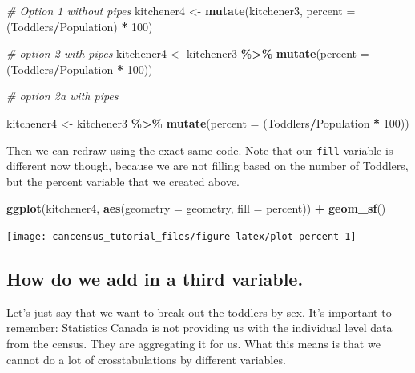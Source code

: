 \documentclass[
]{article}
\newenvironment{Shaded}{\begin{snugshade}}{\end{snugshade}}
\newcommand{\CommentTok}[1]{\textcolor[rgb]{0.56,0.35,0.01}{\textit{#1}}}
\newcommand{\DataTypeTok}[1]{\textcolor[rgb]{0.13,0.29,0.53}{#1}}
\newcommand{\DecValTok}[1]{\textcolor[rgb]{0.00,0.00,0.81}{#1}}
\newcommand{\KeywordTok}[1]{\textcolor[rgb]{0.13,0.29,0.53}{\textbf{#1}}}
\newcommand{\NormalTok}[1]{#1}
\newcommand{\OperatorTok}[1]{\textcolor[rgb]{0.81,0.36,0.00}{\textbf{#1}}}
\newcommand{\StringTok}[1]{\textcolor[rgb]{0.31,0.60,0.02}{#1}}
\begin{document}
\begin{Shaded}
\begin{Highlighting}[]
\CommentTok{\# Option 1 without pipes}
\NormalTok{kitchener4 <{-}}\StringTok{ }\KeywordTok{mutate}\NormalTok{(kitchener3, }\DataTypeTok{percent =}\NormalTok{ (Toddlers}\OperatorTok{/}\NormalTok{Population) }\OperatorTok{*}\StringTok{ }\DecValTok{100}\NormalTok{)}

\CommentTok{\# option 2 with pipes}
\NormalTok{kitchener4 <{-}}\StringTok{ }\NormalTok{kitchener3 }\OperatorTok{\%>\%}\StringTok{ }\KeywordTok{mutate}\NormalTok{(}\DataTypeTok{percent =}\NormalTok{ (Toddlers}\OperatorTok{/}\NormalTok{Population }\OperatorTok{*}\StringTok{ }\DecValTok{100}\NormalTok{))}

\CommentTok{\# option 2a with pipes}

\NormalTok{kitchener4 <{-}}\StringTok{ }\NormalTok{kitchener3 }\OperatorTok{\%>\%}\StringTok{ }\KeywordTok{mutate}\NormalTok{(}\DataTypeTok{percent =}\NormalTok{ (Toddlers}\OperatorTok{/}\NormalTok{Population }\OperatorTok{*}\StringTok{ }\DecValTok{100}\NormalTok{))}
\end{Highlighting}
\end{Shaded}

Then we can redraw using the exact same code. Note that our
\texttt{fill} variable is different now though, because we are not
filling based on the number of Toddlers, but the percent variable that
we created above.

\begin{Shaded}
\begin{Highlighting}[]
\KeywordTok{ggplot}\NormalTok{(kitchener4, }\KeywordTok{aes}\NormalTok{(}\DataTypeTok{geometry =}\NormalTok{ geometry, }\DataTypeTok{fill =}\NormalTok{ percent)) }\OperatorTok{+}\StringTok{ }\KeywordTok{geom\_sf}\NormalTok{()}
\end{Highlighting}
\end{Shaded}

\begin{center}\texttt{[image: cancensus\_tutorial\_files/figure-latex/plot-percent-1]} \end{center}

\hypertarget{how-do-we-add-in-a-third-variable.}{%
\subsection{How do we add in a third
variable.}\label{how-do-we-add-in-a-third-variable.}}

Let's just say that we want to break out the toddlers by sex. It's
important to remember: Statistics Canada is not providing us with the
individual level data from the census. They are aggregating it for us.
What this means is that we cannot do a lot of crosstabulations by
different variables.
\end{document}
